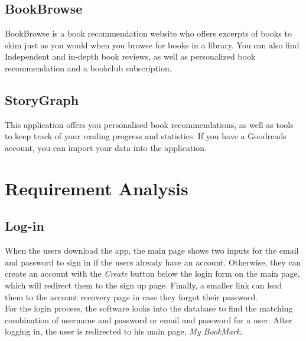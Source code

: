 \documentclass[conference]{IEEEtran}
\begin{document}
\subsection{BookBrowse} 
BookBrowse is a book recommendation website who offers excerpts of books to skim just as you would when you browse for books in a library. You can also find Independent and in-depth book reviews, as well as personalized book recommendation and a bookclub subscription. \cite{Bookbrowse}\\

\subsection{StoryGraph} 
This application offers you personalised book recommendations, as well as tools to keep track of your reading progress and statistics. If you have a Goodreads account, you can import your data into the application. \cite{Storygraph} \\

\section{Requirement Analysis}

\subsection{Log-in}
When the users download the app, the main page shows two inputs for the email and password to sign in if the users already have an account. Otherwise, they can create an account with the \textit{Create} button below the login form on the main page, which will redirect them to the sign up page. Finally, a smaller link can lead them to the account recovery page in case they forgot their password.\\
For the login process, the software looks into the database to find the matching combination of username and password or email and password for a user. After logging in, the user is redirected to his main page, \textit{My BookMark}.\\
\end{document}
